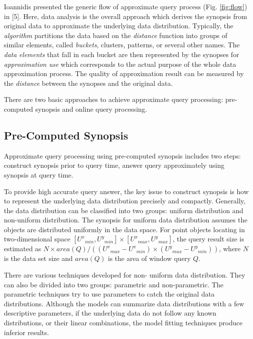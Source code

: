 \documentclass[twocolumn]{article}
\begin{document}
Ioannidis presented the generic flow of approximate query process (Fig. \ref{fig:flow}) in [5]. Here, data analysis is the overall approach which derives the synopsis from original data to approximate the underlying data distribution. 
Typically, the \textit{algorithm} partitions the data based on the \textit{distance} function into groups of similar elements, called \textit{buckets}, clusters, patterns, or several other names. The \textit{data elements} that fall in each bucket are then represented by the synopses for \textit{approximation use} which corresponds to the actual purpose of the whole data approximation process. The quality of approximation result can be measured by the \textit{distance} between the synopses and the original data.

There are two basic approaches to achieve approximate query processing: pre-computed synopsis and online query processing.

\subsection{Pre-Computed Synopsis}

Approximate query processing using pre-computed synopsis includes two steps: construct synopsis prior to query time, answer query approximately using synopsis at query time.

To provide high accurate query answer, the key issue to construct synopsis is how to represent the underlying data distribution precisely and compactly. Generally, the data distribution can be classified into two groups: uniform distribution and non-uniform distribution. The synopsis for uniform data distribution assumes the objects are distributed uniformly in the data space. For point objects locating in two-dimensional space $[{U^x}_{min}, {U^y}_{min}] \times [{U^x}_{max}, {U^y}_{max}]$, the query result size is estimated as 
$N \times \textit{area}(Q)/(({U^x}_{max} - {U^x}_{min}) \times ({U^y}_{max} - {U^y}_{min}))$, where $N$ is the data set size and $\textit{area}(Q)$ is the area of window query $Q$.

There are various techniques developed for non- uniform data distribution. They can also be divided into two groups: parametric and non-parametric. The parametric techniques try to use parameters to catch the original data distributions. Although the models can summarize data distributions with a few descriptive parameters, if the underlying data do not follow any known distributions, or their linear combinations, the model fitting techniques produce inferior results.
\end{document}
